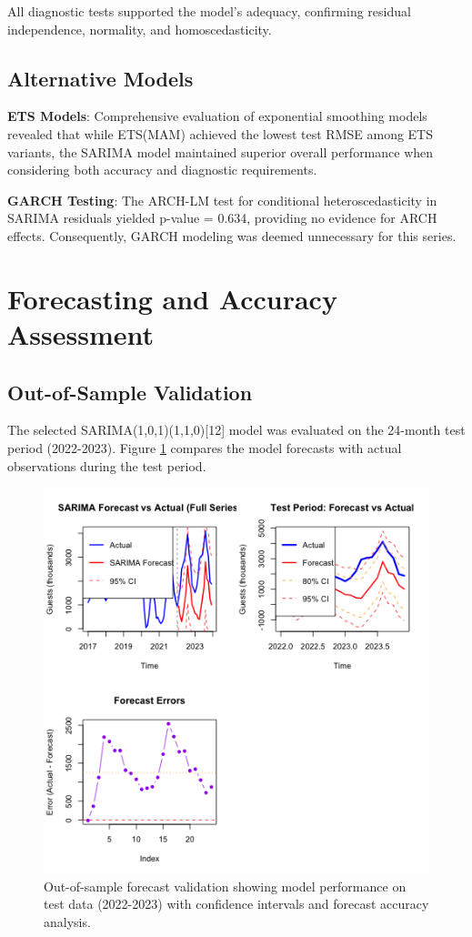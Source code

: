 \documentclass[journal]{IEEEtran}
\begin{document}
All diagnostic tests supported the model's adequacy, confirming residual independence, normality, and homoscedasticity.

\subsection{Alternative Models}

\textbf{ETS Models}: Comprehensive evaluation of exponential smoothing models revealed that while ETS(MAM) achieved the lowest test RMSE among ETS variants, the SARIMA model maintained superior overall performance when considering both accuracy and diagnostic requirements.

\textbf{GARCH Testing}: The ARCH-LM test for conditional heteroscedasticity in SARIMA residuals yielded p-value = 0.634, providing no evidence for ARCH effects. Consequently, GARCH modeling was deemed unnecessary for this series.

\section{Forecasting and Accuracy Assessment}

\subsection{Out-of-Sample Validation}

The selected SARIMA(1,0,1)(1,1,0)[12] model was evaluated on the 24-month test period (2022-2023). Figure \ref{fig:forecast_validation} compares the model forecasts with actual observations during the test period.

\begin{figure}[h]
    \centering
    \includegraphics[width=1\linewidth]{plots/forecast-vs-actual.png}
    \caption{Out-of-sample forecast validation showing model performance on test data (2022-2023) with confidence intervals and forecast accuracy analysis.}
    \label{fig:forecast_validation}
\end{figure}
\end{document}
